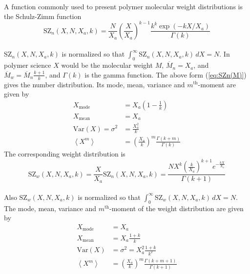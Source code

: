 A function commonly used to present polymer molecular weight distributions is the Schulz-Zimm function \cite{Zimm1948}
\begin{equation}
\textrm{SZ}_n(X,N,X_a,k) =  \frac{N}{X_a}
\left(\frac{X}{X_a}\right)^{k-1}
\frac{k^k\exp(-kX/X_a)}{\Gamma(k)}
\label{eq:SZn(M)}
\end{equation}
~\\
$\text{SZ}_n(X,N,X_a,k)$ is normalized so that $\int_0^\infty\!
\text{SZ}_n(X,N,X_a,k)\,dX = N$.
In polymer science $X$ would be the molecular weight $M$,
$\overline{M}_n=X_a$, and $\overline{M}_w=\overline{M}_n\frac{k+1}{k}$,
and $\Gamma(k)$ is the gamma function.
The above form (\ref{eq:SZn(M)}) gives the number distribution.
Its mode, mean, variance and $m^\textrm{th}$-moment are given by
\begin{subequations}
\begin{align}
X_\textrm{mode} &= X_a \left(1-\frac{1}{k}\right)\\
X_\textrm{mean} &= X_a \\
\textrm{Var}\left(X\right)=\sigma^2 &= \frac{X_a^2}{k} \\
\left\langle X^m \right\rangle &=
\left(\frac{X_a}{k}\right)^m  \frac{\Gamma \left(k+m\right)}{\Gamma (k)}
\label{eq:SZstatparam}
\end{align}
\end{subequations}
The corresponding weight distribution is
\begin{equation}
\textrm{SZ}_w(X,N,X_a,k) = \frac{X}{X_a}\textrm{SZ}_n(X,N,X_a,k)
=  \frac{N X^k \left(\frac{k}{X_a}\right)^{k+1} e^{-\frac{kX}{X_a}}}{\Gamma(k+1)}
\end{equation}
~\\
Also $\textrm{SZ}_w(X,N,X_a,k)$ is normalized so that $\int_0^\infty\!
\textrm{SZ}_w(X,N,X_a,k)\,dX = N$.
The mode, mean, variance and
$m^\textrm{th}$-moment of the weight distribution are given by
\begin{subequations}
\begin{align}
X_\textrm{mode} &= X_a\\
X_\textrm{mean} &= X_a \frac{1+k}{k}\\
\textrm{Var}\left(X\right)&=\sigma^2 = X_a^2\frac{1+k}{k^2} \\
\left\langle X^m \right\rangle &=
\left(\frac{X_a}{k}\right)^m  \frac{\Gamma \left(k+m+1\right)}{\Gamma \left(k+1\right)}
\label{eq:SZFstatparam}
\end{align}
\end{subequations}

